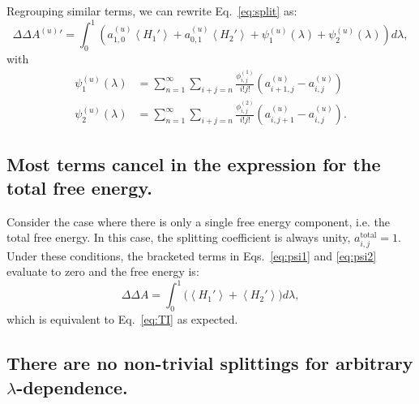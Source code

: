 \documentclass{article}
\begin{document}
Regrouping similar terms, we can rewrite Eq.~\ref{eq:split} as:
\begin{equation}
\Delta\Delta {A^{(u)}}' =
	\int_0^1 \left(
        a_{1,0}^{(u)}\left\langle H_1' \right\rangle +
        a_{0,1}^{(u)}\left\langle H_2' \right\rangle +
        \psi_1^{(u)}(\lambda) +
        \psi_2^{(u)}(\lambda)
    \right) d\lambda,
\label{eq:dA_expansion}
\end{equation}
with
\begin{align}
\psi_1^{(u)}(\lambda) &=
	\sum_{n=1}^{\infty}
    \sum_{i+j=n}
        \frac{\phi_{i,j}^{(1)}}{i!j!}
        \left(
            {a_{i+1,j}^{(u)}} -
            {a_{i,j}^{(u)}}
        \right) \label{eq:psi1}\\
\psi_2^{(u)}(\lambda) &=
	\sum_{n=1}^{\infty}
    \sum_{i+j=n}
        \frac{\phi_{i,j}^{(2)}}{i!j!}
        \left(
            a_{i,j+1}^{(u)} -
            a_{i,j}^{(u)}
      	\right)\label{eq:psi2}.
\end{align}



\subsection{Most terms cancel in the expression for the total free energy.}

Consider the case where there is only a single free energy component, i.e. the total free energy. In this case, the splitting coefficient is always unity, $a_{i,j}^\mathrm{total}=1$. Under these conditions, the bracketed terms in Eqs.~\ref{eq:psi1} and \ref{eq:psi2} evaluate to zero and the free energy is:
\begin{equation}
\Delta\Delta A = \int_0^1 \bigg(
	\left\langle H_1' \right\rangle +
    \left\langle H_2' \right\rangle
\bigg) d\lambda,
\end{equation}
which is equivalent to Eq.~\ref{eq:TI} as expected.





\subsection{There are no non-trivial splittings for arbitrary $\lambda$-dependence.}
\end{document}
